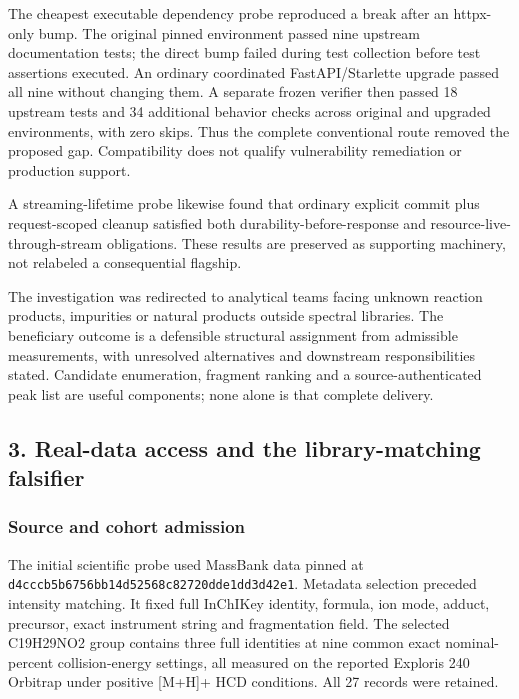 \documentclass[
  10pt,
]{article}
\begin{document}
The cheapest executable dependency probe reproduced a break after an
httpx-only bump. The original pinned environment passed nine upstream
documentation tests; the direct bump failed during test collection
before test assertions executed. An ordinary coordinated
FastAPI/Starlette upgrade passed all nine without changing them. A
separate frozen verifier then passed 18 upstream tests and 34 additional
behavior checks across original and upgraded environments, with zero
skips. Thus the complete conventional route removed the proposed gap.
Compatibility does not qualify vulnerability remediation or production
support.

A streaming-lifetime probe likewise found that ordinary explicit commit
plus request-scoped cleanup satisfied both durability-before-response
and resource-live-through-stream obligations. These results are
preserved as supporting machinery, not relabeled a consequential
flagship.

The investigation was redirected to analytical teams facing unknown
reaction products, impurities or natural products outside spectral
libraries. The beneficiary outcome is a defensible structural assignment
from admissible measurements, with unresolved alternatives and
downstream responsibilities stated. Candidate enumeration, fragment
ranking and a source-authenticated peak list are useful components; none
alone is that complete delivery.

\hypertarget{real-data-access-and-the-library-matching-falsifier}{%
\subsection{3. Real-data access and the library-matching
falsifier}\label{real-data-access-and-the-library-matching-falsifier}}

\hypertarget{source-and-cohort-admission}{%
\subsubsection{Source and cohort
admission}\label{source-and-cohort-admission}}

The initial scientific probe used MassBank data pinned at
\nolinkurl{d4cccb5b6756bb14d52568c82720dde1dd3d42e1}. Metadata selection
preceded intensity matching. It fixed full InChIKey identity, formula,
ion mode, adduct, precursor, exact instrument string and fragmentation
field. The selected C19H29NO2 group contains three full identities at
nine common exact nominal-percent collision-energy settings, all
measured on the reported Exploris 240 Orbitrap under positive {[}M+H{]}+
HCD conditions. All 27 records were retained.
\end{document}
